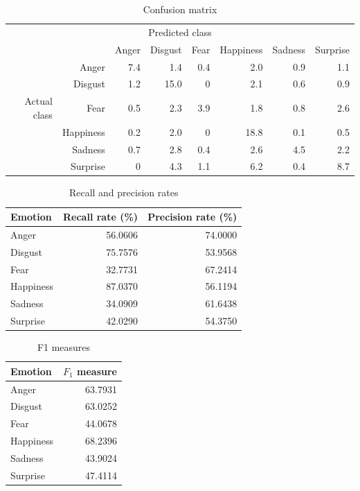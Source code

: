 \documentclass[12pt]{article}
\begin{document}
\begin{table}
\centering
\begin{tabular}{r r | r r r r r r}
\multicolumn{8}{c}{Predicted class} \\
&  & Anger & Disgust & Fear & Happiness & Sadness & Surprise \\
\hline
& Anger & 7.4 & 1.4  & 0.4 & 2.0  & 0.9 & 1.1 \\
 & Disgust & 1.2 & 15.0 & 0   & 2.1  & 0.6 & 0.9 \\
Actual class & Fear & 0.5 & 2.3  & 3.9 & 1.8  & 0.8 & 2.6 \\
 & Happiness & 0.2 & 2.0  & 0   & 18.8 & 0.1 & 0.5 \\
& Sadness & 0.7 & 2.8  & 0.4 & 2.6  & 4.5 & 2.2 \\
& Surprise & 0   & 4.3  & 1.1 & 6.2  & 0.4 & 8.7 \\
\end{tabular}
\caption{Confusion matrix}
\end{table}



\begin{table}
\centering
\begin{tabular}{l | r r}
Emotion & Recall rate (\%) & Precision rate (\%) \\
\hline
Anger & 56.0606 & 74.0000 \\
Disgust & 75.7576 & 53.9568 \\
Fear & 32.7731 & 67.2414 \\
Happiness & 87.0370 & 56.1194 \\
Sadness & 34.0909 & 61.6438 \\
Surprise & 42.0290 & 54.3750 \\
\end{tabular}
\caption{Recall and precision rates}
\end{table}

\begin{table}
\centering
\begin{tabular}{l | r}
Emotion & \( F_1 \) measure \\
\hline
Anger & 63.7931 \\
Disgust & 63.0252 \\
Fear & 44.0678 \\
Happiness & 68.2396 \\
Sadness & 43.9024 \\
Surprise & 47.4114 \\
\end{tabular}
\caption{F1 measures}
\end{table}
\end{document}
